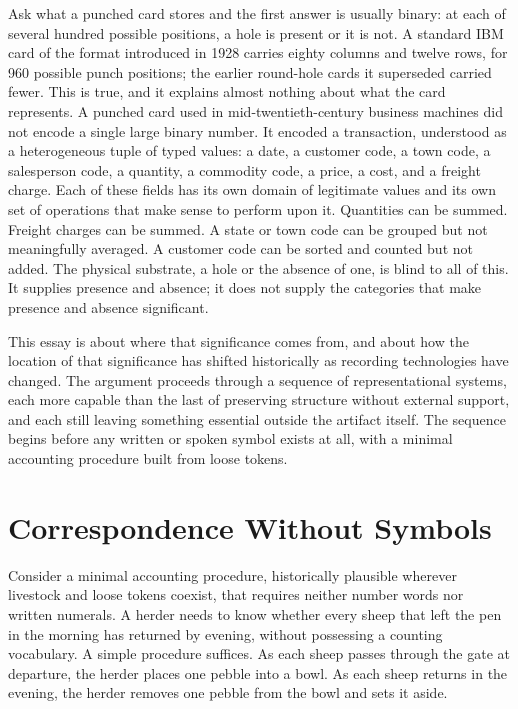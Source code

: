 \documentclass[11pt]{article}
\begin{document}
Ask what a punched card stores and the first answer is usually binary: at each of several hundred possible positions, a hole is present or it is not. A standard IBM card of the format introduced in 1928 carries eighty columns and twelve rows, for 960 possible punch positions; the earlier round-hole cards it superseded carried fewer. This is true, and it explains almost nothing about what the card represents. A punched card used in mid-twentieth-century business machines did not encode a single large binary number. It encoded a transaction, understood as a heterogeneous tuple of typed values: a date, a customer code, a town code, a salesperson code, a quantity, a commodity code, a price, a cost, and a freight charge. Each of these fields has its own domain of legitimate values and its own set of operations that make sense to perform upon it. Quantities can be summed. Freight charges can be summed. A state or town code can be grouped but not meaningfully averaged. A customer code can be sorted and counted but not added. The physical substrate, a hole or the absence of one, is blind to all of this. It supplies presence and absence; it does not supply the categories that make presence and absence significant.

This essay is about where that significance comes from, and about how the location of that significance has shifted historically as recording technologies have changed. The argument proceeds through a sequence of representational systems, each more capable than the last of preserving structure without external support, and each still leaving something essential outside the artifact itself. The sequence begins before any written or spoken symbol exists at all, with a minimal accounting procedure built from loose tokens.

\section{Correspondence Without Symbols}

Consider a minimal accounting procedure, historically plausible wherever livestock and loose tokens coexist, that requires neither number words nor written numerals. A herder needs to know whether every sheep that left the pen in the morning has returned by evening, without possessing a counting vocabulary. A simple procedure suffices. As each sheep passes through the gate at departure, the herder places one pebble into a bowl. As each sheep returns in the evening, the herder removes one pebble from the bowl and sets it aside.
\end{document}
